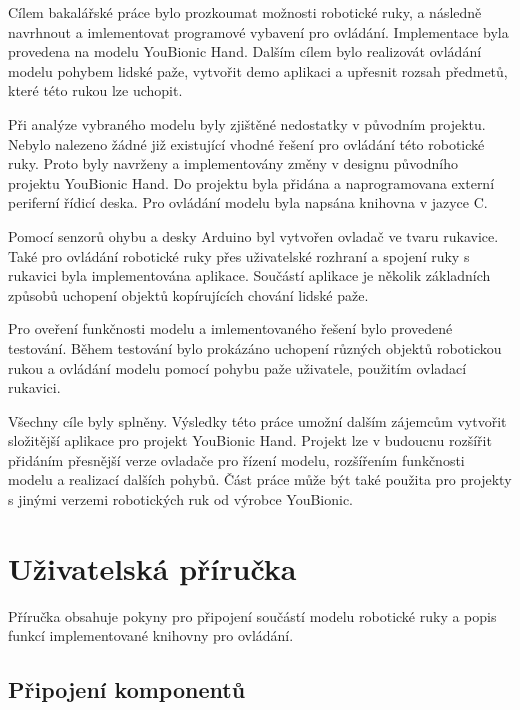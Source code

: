 \documentclass[thesis=B,czech]{FITthesis}[2012/06/26]
\begin{document}
\begin{conclusion}

Cílem bakalářské práce bylo prozkoumat možnosti robotické ruky, a následně navrhnout a imlementovat programové vybavení pro ovládání. Implementace byla provedena na modelu YouBionic Hand. Dalším cílem bylo realizovát ovládání modelu pohybem lidské paže, vytvořit demo aplikaci a upřesnit rozsah předmetů, které této rukou lze uchopit.


Při analýze vybraného modelu  byly zjištěné nedostatky v původním projektu. Nebylo nalezeno žádné již existující vhodné řešení pro ovládání této robotické ruky. Proto byly navrženy a implementovány změny v designu původního projektu YouBionic Hand. Do projektu byla přidána a naprogramovana externí periferní řídicí deska. Pro ovládání modelu byla napsána knihovna v jazyce C.


Pomocí senzorů ohybu a desky Arduino byl vytvořen ovladač ve tvaru rukavice. Také pro ovládání robotické ruky přes uživatelské rozhraní a spojení ruky s rukavici byla implementována aplikace. Součástí aplikace je několik základních způsobů uchopení objektů kopírujících chování lidské paže.


Pro oveření funkčnosti modelu a imlementovaného řešení bylo provedené testování. Během testování bylo prokázáno uchopení různých objektů robotickou rukou a ovládání modelu pomocí pohybu paže uživatele, použitím ovladací rukavici. 


Všechny cíle byly splněny. Výsledky této práce umožní dalším zájemcům vytvořit složitější aplikace pro projekt YouBionic Hand. Projekt lze v budoucnu rozšířit přidáním přesnější verze ovladače pro řízení modelu, rozšířením funkčnosti modelu a realizací dalších pohybů. Část práce může být také použita pro projekty s jinými verzemi robotických ruk od výrobce YouBionic.


\end{conclusion}




\appendix


\chapter{Uživatelská příručka}

Příručka obsahuje pokyny pro připojení součástí modelu robotické ruky a popis funkcí implementované knihovny pro ovládání.

\section{Připojení komponentů}
\end{document}
